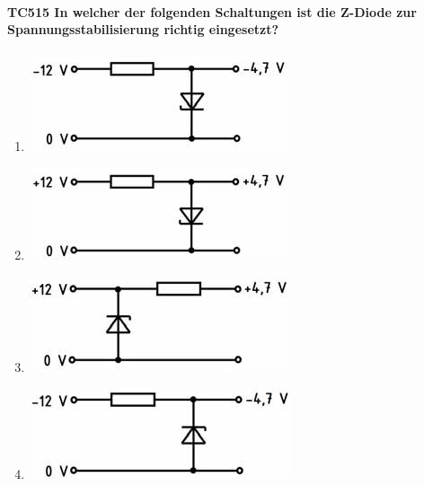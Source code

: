 \documentclass[8pt]{article}
\begin{document}
\begin{enumerate}
\begin{enumerate}[nolistsep,label=\Alph*]
{\begin{enumerate}[nolistsep,label=\Alph*]
\paragraph*{TC515 In welcher der folgenden Schaltungen ist die Z-Diode zur Spannungsstabilisierung richtig eingesetzt?}
\begin{enumerate}[nolistsep,label=\Alph*]
\item
	\begin{center}
		\begin{minipage}{\linewidth}
			\centering
			\includegraphics[scale=1.0]{pics/tc515_a.jpg}
		\end{minipage}
	\end{center}
\item
	\begin{center}
		\begin{minipage}{\linewidth}
			\centering
			\includegraphics[scale=1.0]{pics/tc515_b.jpg}
		\end{minipage}
	\end{center}
\item
	\begin{center}
		\begin{minipage}{\linewidth}
			\centering
			\includegraphics[scale=1.0]{pics/tc515_c.jpg}
		\end{minipage}
	\end{center}
\item
	\begin{center}
		\begin{minipage}{\linewidth}
			\centering
			\includegraphics[scale=1.0]{pics/tc515_d.jpg}
		\end{minipage}
	\end{center}
\end{enumerate}


\end{enumerate}}
\end{enumerate}
\end{enumerate}
\end{document}
